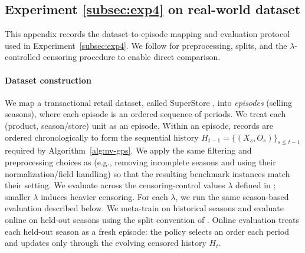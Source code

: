\documentclass[11pt]{article}
\begin{document}
\subsection{Experiment \ref{subsec:exp4} on real-world dataset}
\label{app:exp4}

This appendix records the dataset-to-episode mapping and evaluation protocol used in
Experiment~\ref{subsec:exp4}. We follow \citet[Sec.~6.3]{hssaine2024censored} for preprocessing,
splits, and the \(\lambda\)-controlled censoring procedure to enable direct comparison.



\paragraph{Dataset construction}
\label{app:exp4-data}

We map a transactional retail dataset, called SuperStore \citep{Sahoo2023SuperstoreSales}, into \emph{episodes} (selling seasons), where each episode is an ordered sequence of periods. We treat each (product, season/store) unit as an episode. Within an episode, records are ordered chronologically to form the sequential history \(H_{t-1}=\{(X_s,O_s)\}_{s\le t-1}\) required by
Algorithm~\ref{alg:nv-gps}. We apply the same filtering and preprocessing choices as
\citet{hssaine2024censored} (e.g., removing incomplete seasons and using their normalization/field
handling) so that the resulting benchmark instances match their setting.
We evaluate across the censoring-control values \(\lambda\) defined in
\citet{hssaine2024censored}; smaller \(\lambda\) induces heavier censoring. For each \(\lambda\), we run
the same season-based evaluation described below.
We meta-train on historical seasons and evaluate online on held-out seasons using the split
convention of \citet{hssaine2024censored}. Online evaluation treats each held-out season as a fresh
episode: the policy selects an order each period and updates only through the evolving censored
history \(H_t\).
\end{document}
